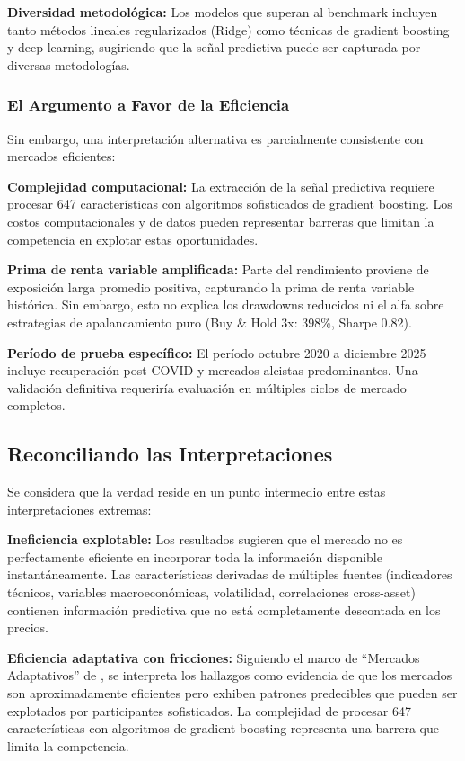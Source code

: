 \documentclass[11pt,a4paper]{article}
\begin{document}
\textbf{Diversidad metodológica:} Los modelos que superan al benchmark incluyen tanto métodos lineales regularizados (Ridge) como técnicas de gradient boosting y deep learning, sugiriendo que la señal predictiva puede ser capturada por diversas metodologías.

\subsubsection{El Argumento a Favor de la Eficiencia}

Sin embargo, una interpretación alternativa es parcialmente consistente con mercados eficientes:

\textbf{Complejidad computacional:} La extracción de la señal predictiva requiere procesar 647 características con algoritmos sofisticados de gradient boosting. Los costos computacionales y de datos pueden representar barreras que limitan la competencia en explotar estas oportunidades.

\textbf{Prima de renta variable amplificada:} Parte del rendimiento proviene de exposición larga promedio positiva, capturando la prima de renta variable histórica. Sin embargo, esto no explica los drawdowns reducidos ni el alfa sobre estrategias de apalancamiento puro (Buy \& Hold 3x: 398\%, Sharpe 0.82).

\textbf{Período de prueba específico:} El período octubre 2020 a diciembre 2025 incluye recuperación post-COVID y mercados alcistas predominantes. Una validación definitiva requeriría evaluación en múltiples ciclos de mercado completos.

\subsection{Reconciliando las Interpretaciones}

Se considera que la verdad reside en un punto intermedio entre estas interpretaciones extremas:

\textbf{Ineficiencia explotable:} Los resultados sugieren que el mercado no es perfectamente eficiente en incorporar toda la información disponible instantáneamente. Las características derivadas de múltiples fuentes (indicadores técnicos, variables macroeconómicas, volatilidad, correlaciones cross-asset) contienen información predictiva que no está completamente descontada en los precios.

\textbf{Eficiencia adaptativa con fricciones:} Siguiendo el marco de ``Mercados Adaptativos'' de \citet{lo2019}, se interpreta los hallazgos como evidencia de que los mercados son aproximadamente eficientes pero exhiben patrones predecibles que pueden ser explotados por participantes sofisticados. La complejidad de procesar 647 características con algoritmos de gradient boosting representa una barrera que limita la competencia.
\end{document}
